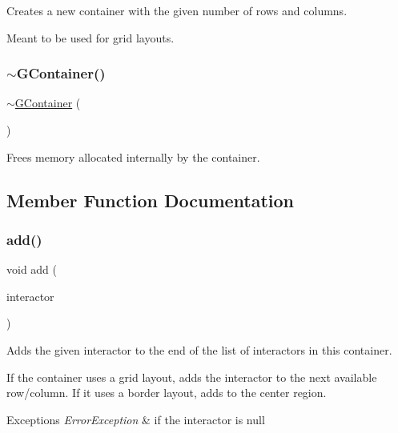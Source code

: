 Creates a new container with the given number of rows and columns. 

Meant to be used for grid layouts. \mbox{\label{classsgl_1_1GContainer_a45b3c0c0cc9c78097c024ca842978692}} 
\subsubsection{\texorpdfstring{$\sim$\+G\+Container()}{~GContainer()}}
{\footnotesize\ttfamily $\sim$\mbox{\hyperlink{classsgl_1_1GContainer}{G\+Container}} (\begin{DoxyParamCaption}{ }\end{DoxyParamCaption})\hspace{0.3cm}{\ttfamily [override]}}



Frees memory allocated internally by the container. 



\subsection{Member Function Documentation}
\mbox{\label{classsgl_1_1GContainer_a6f99b7c841256dbdc5acaafbbca4e685}} 
\subsubsection{\texorpdfstring{add()}{add()}\hspace{0.1cm}{\footnotesize\ttfamily [1/2]}}
{\footnotesize\ttfamily void add (\begin{DoxyParamCaption}\item[{\mbox{\hyperlink{classsgl_1_1GInteractor}{G\+Interactor}} $\ast$}]{interactor }\end{DoxyParamCaption})\hspace{0.3cm}{\ttfamily [virtual]}}



Adds the given interactor to the end of the list of interactors in this container. 

If the container uses a grid layout, adds the interactor to the next available row/column. If it uses a border layout, adds to the center region. 
\begin{DoxyExceptions}{Exceptions}
{\em Error\+Exception} & if the interactor is null \\
\hline
\end{DoxyExceptions}
\mbox{\label{classsgl_1_1GContainer_a33b08fe5428ed634a658deab076099f7}} 
